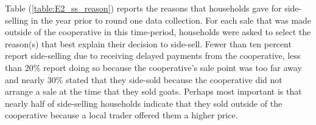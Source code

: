 \documentclass[11pt]{article}
\begin{document}
\begin{table}[!h]
  \centering
  \caption{Reasons for Side-Selling (2018 Sample)}
  \label{table:E2_ss_reason}
\end{table}
\doublespacing

Table (\ref{table:E2_ss_reason}) reports the reasons that households gave for side-selling in the year prior to round one data collection. For each sale that was made outside of the cooperative in this time-period, households were asked to select the reason(s) that best explain their decision to side-sell. Fewer than ten percent report side-selling due to receiving delayed payments from the cooperative, less than 20\% report doing so because the cooperative's sale point was too far away and nearly 30\% stated that they side-sold because the cooperative did not arrange a sale at the time that they sold goats. Perhaps most important is that nearly half of side-selling households indicate that they sold outside of the cooperative because a local trader offered them a higher price. 

\end{document}
